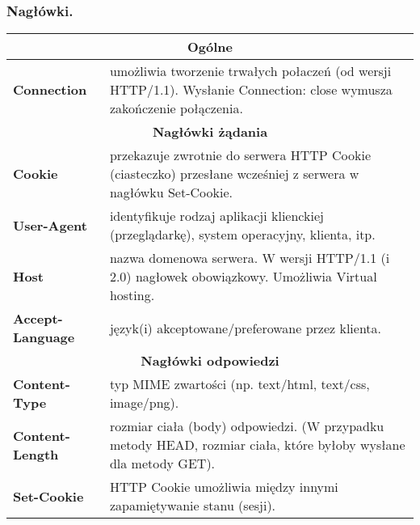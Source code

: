 \documentclass[../main.tex]{subfiles}
\begin{document}
    \subsubsection{Nagłówki.}
    \begin{table}[H]
        \begin{center}
            \begin{tabular}{|p{4cm}|p{12cm}|}
                \hline
                \multicolumn{2}{|c|}{\textbf{Ogólne}}\\
                \hline
                \textbf{Connection} & umożliwia tworzenie trwałych połaczeń (od wersji HTTP/1.1). Wysłanie Connection: close wymusza zakończenie połączenia.\\
                \hline
                \hline
                \multicolumn{2}{|c|}{\textbf{Nagłówki żądania}}\\
                \hline
                \textbf{Cookie} & przekazuje zwrotnie do serwera HTTP Cookie (ciasteczko) przesłane wcześniej z serwera w nagłówku Set-Cookie.\\
                \hline
                \textbf{User-Agent} & identyfikuje rodzaj aplikacji klienckiej (przeglądarkę), system operacyjny, klienta, itp.\\
                \hline
                \textbf{Host} & nazwa domenowa serwera. W wersji HTTP/1.1 (i 2.0) nagłowek obowiązkowy. Umożliwia Virtual hosting.\\
                \hline
                \textbf{Accept-Language} & język(i) akceptowane/preferowane przez klienta.\\
                \hline
                \hline
                \multicolumn{2}{|c|}{\textbf{Nagłówki odpowiedzi}}\\
                \hline
                \textbf{Content-Type} & typ MIME zwartości (np. text/html, text/css, image/png).\\
                \hline
                \textbf{Content-Length} & rozmiar ciała (body) odpowiedzi. (W przypadku metody HEAD, rozmiar ciała, które byłoby wysłane dla metody GET).\\
                \hline
                \textbf{Set-Cookie} & HTTP Cookie umożliwia między innymi zapamiętywanie stanu (sesji).\\
                \hline
            \end{tabular}
        \end{center}
    \end{table}
\end{document}

